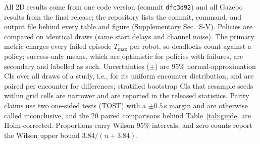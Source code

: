 All 2D results come from one code version (commit \texttt{dfc3d92}) and all Gazebo results from the final release; the repository lists the commit, command, and output file behind every table and figure (Supplementary Sec.~S-V). Policies are compared on identical draws (same start delays and channel noise). The primary metric charges every failed episode $T_{\max}$ per robot, so deadlocks count against a policy; success-only means, which are optimistic for policies with failures, are secondary and labelled as such. Uncertainties ($\pm$) are 95\% normal-approximation CIs over all draws of a study, i.e., for its uniform encounter distribution, and are paired per encounter for differences; stratified bootstrap CIs that resample seeds within grid cells are narrower and are reported in the released statistics. Parity claims use two one-sided tests (TOST) with a $\pm0.5$\,s margin and are otherwise called inconclusive, and the 20 paired comparisons behind Table~\ref{tab:guide} are Holm-corrected. Proportions carry Wilson 95\% intervals, and zero counts report the Wilson upper bound $3.84/(n+3.84)$.